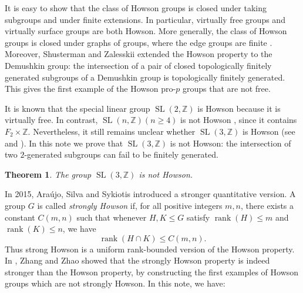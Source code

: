 \documentclass[]{amsart}
\newtheorem{thm}{Theorem}[section]
\newtheorem*{fixed point criterion}{\fixed point criterion}
\theoremstyle{definition}
\theoremstyle{remark}
\numberwithin{equation}{section}
\newcommand{\SL}{\operatorname{SL}}
\newcommand{\Z}{\mathbb Z}
\newcommand{\rank}{\operatorname{rank}}
\begin{document}
It is easy to show that the class of Howson groups is closed under taking subgroups and under ﬁnite extensions. In particular, virtually free groups and virtually surface groups are both Howson. More generally, the class of Howson groups is closed under graphs of groups, where the edge groups are ﬁnite  \cite{Sky05}. 
Moreover, Shusterman and Zalesskii \cite{SZ20} extended the Howson property to the Demushkin group: the intersection of a pair of closed topologically finitely generated subgroups of a Demushkin group is topologically finitely generated. This gives the first example of the Howson pro-$p$ groups that are not free.

 


It is known that the special linear group $\SL(2,\mathbb{Z})$ is Howson because it is virtually free. In contrast, $\SL(n,\Z) (n\geq 4)$ is not Howson \cite{LR11}, since it contains $F_2 \times \mathbb{Z}$. Nevertheless, it still remains unclear whether $\SL(3,\Z)$ is Howson (see \cite{LR11} and \cite{ka}). In this note we prove that $\SL(3,\Z)$ is not Howson: the intersection of two
$2$-generated subgroups can fail to be finitely generated.


\begin{thm}\label{thm sl3n not howson}
The group $\SL(3,\Z)$ is not Howson.
\end{thm}

In 2015, Ara\'ujo, Silva and Sykiotis \cite{Sky15} introduced a stronger quantitative version. A group $G$ is called \emph{strongly Howson} if, for all
positive integers $m,n$, there exists a constant $C(m,n)$ such that whenever
$H,K\leq G$ satisfy $\rank(H)\leq m$ and $\rank(K)\leq n$, 
we have
\[
    \rank(H\cap K)\leq C(m,n).
\]
Thus strong Howson is a uniform rank-bounded version of the Howson property. In \cite{ZZ261}, Zhang and Zhao showed that the strongly Howson property is indeed stronger than the Howson property, by constructing the first examples of Howson groups which are not strongly Howson. In this note, we have:
\end{document}

